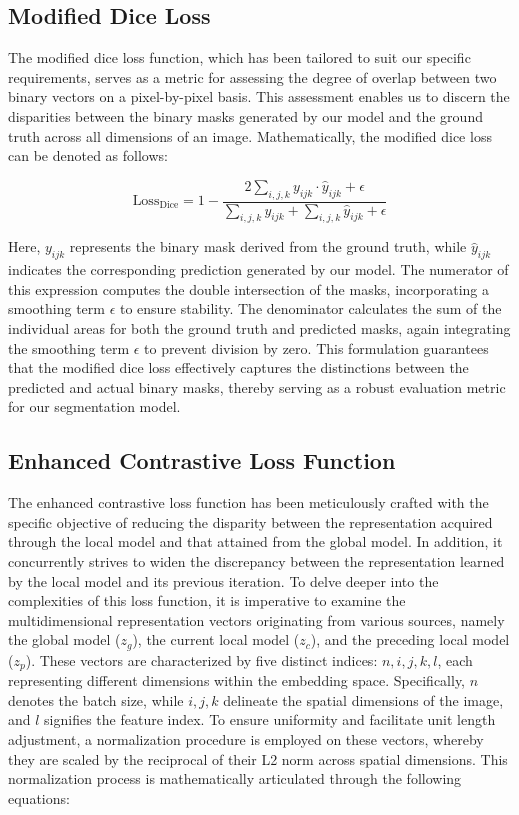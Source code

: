 \subsection{Modified Dice Loss}
The modified dice loss function, which has been tailored to suit our specific requirements, serves as a metric for assessing the degree of overlap between two binary vectors on a pixel-by-pixel basis. This assessment enables us to discern the disparities between the binary masks generated by our model and the ground truth across all dimensions of an image. Mathematically, the modified dice loss can be denoted as follows:

\begin{equation} \label{Eq: Dice Loss}
\text{Loss}_{\text{Dice}} = 1 - \frac{2 \sum_{i,j,k} y_{ijk} \cdot \hat{y}_{ijk} + \epsilon}{\sum_{i,j,k} y_{ijk} + \sum_{i,j,k} \hat{y}_{ijk} + \epsilon}
\end{equation}

Here, \(y_{ijk}\) represents the binary mask derived from the ground truth, while \(\hat{y}_{ijk}\) indicates the corresponding prediction generated by our model. The numerator of this expression computes the double intersection of the masks, incorporating a smoothing term \(\epsilon\) to ensure stability. The denominator calculates the sum of the individual areas for both the ground truth and predicted masks, again integrating the smoothing term \(\epsilon\) to prevent division by zero. This formulation guarantees that the modified dice loss effectively captures the distinctions between the predicted and actual binary masks, thereby serving as a robust evaluation metric for our segmentation model.

\subsection{Enhanced Contrastive Loss Function}

The enhanced contrastive loss function has been meticulously crafted with the specific objective of reducing the disparity between the representation acquired through the local model and that attained from the global model. In addition, it concurrently strives to widen the discrepancy between the representation learned by the local model and its previous iteration. To delve deeper into the complexities of this loss function, it is imperative to examine the multidimensional representation vectors originating from various sources, namely the global model (\(z_g\)), the current local model (\(z_c\)), and the preceding local model (\(z_p\)). These vectors are characterized by five distinct indices: \(n, i, j, k, l\), each representing different dimensions within the embedding space. Specifically, \(n\) denotes the batch size, while \(i, j, k\) delineate the spatial dimensions of the image, and \(l\) signifies the feature index. To ensure uniformity and facilitate unit length adjustment, a normalization procedure is employed on these vectors, whereby they are scaled by the reciprocal of their L2 norm across spatial dimensions. This normalization process is mathematically articulated through the following equations:

